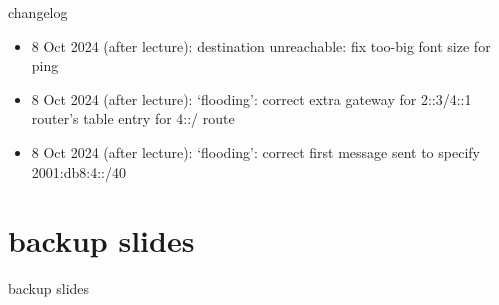 \date{}
\title{}
\date{}

\begin{frame}
    \titlepage
\end{frame}

{\changelogmode
\begin{frame}{changelog}
\begin{itemize}
\item 8 Oct 2024 (after lecture): destination unreachable: fix too-big font size for ping
\item 8 Oct 2024 (after lecture): `flooding': correct extra gateway for 2::3/4::1 router's table entry for 4::/ route
\item 8 Oct 2024 (after lecture): `flooding': correct first message sent to specify 2001:db8:4::/40
\end{itemize}
\end{frame}
}



\section{backup slides}
\begin{frame}{backup slides}
\end{frame}


